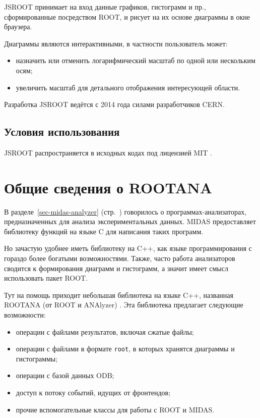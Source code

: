 \documentclass[12pt, a4paper, oneside, onecolumn]{book}
\newcommand{\MIDAS}{\mbox{MIDAS}}
\newcommand{\ROOT}{\mbox{ROOT}}
\newcommand{\ROOTJS}{\mbox{JSROOT}}
\newcommand{\ROOTANA}{\mbox{ROOTANA}}
\begin{document}
\ROOTJS{} принимает на вход данные графиков, гистограмм и пр., сформированные посредством \ROOT{}, и рисует на их основе диаграммы в окне браузера. 

Диаграммы являются интерактивными, в частности пользователь может:

\begin{itemize}
\item назначить или отменить логарифмический масштаб по одной или нескольким осям;
\item увеличить масштаб для детального отображения интересующей области.
\end{itemize}

Разработка \ROOTJS{} ведётся с 2014 года силами разработчиков CERN.

\subsection{Условия использования}

\ROOTJS{} распространяется в исходных кодах под лицензией MIT \cite{JsRootHome}.

\section{Общие сведения о \ROOTANA{}}
\label{sec-rootana}

В разделе~\ref{sec-midas-analyzer} (стр.~\pageref{sec-midas-analyzer}) говорилось о программах-анализаторах, предназначенных для анализа экспериментальных данных. \MIDAS{} предоставляет библиотеку  функций на языке C для написания таких программ.

Но зачастую удобнее иметь библиотеку на C++, как языке программирования с гораздо более богатыми возможностями. Также, часто работа анализаторов сводится к формирования диаграмм и гистограмм, а значит имеет смысл использовать пакет \ROOT{}.

Тут на помощь приходит небольшая библиотека на языке C++, названная \ROOTANA{} (от \ROOT{} и ANAlyzer) \cite{MidasWikiRootana}. Эта библиотека предлагает следующие возможности:

\begin{itemize}
\item операции с файлами результатов, включая сжатые файлы;
\item операции с файлами в формате {\tt root}, в которых хранятся диаграммы и гистограммы;
\item операции с базой данных ODB;
\item доступ к потоку событий, идущих от фронтендов;
\item прочие вспомогательные классы для работы с \ROOT{} и \MIDAS{}.
\end{itemize}
\end{document}
